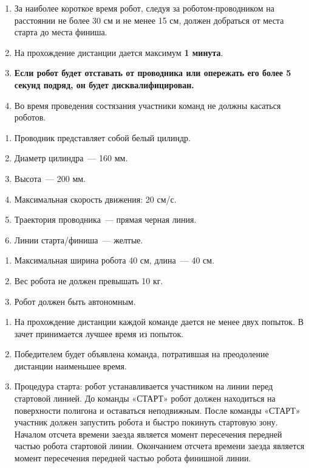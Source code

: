 \noindent{}
\begin{enumerate}
	\item За наиболее короткое время робот, следуя за роботом-проводником на расстоянии не более 30 см и не менее 15 см, должен добраться от места старта до места финиша.
	\item На прохождение дистанции дается максимум {\bfseries 1 минута}.
	\item {\bfseries Если робот будет отставать от проводника или опережать его более 5 секунд подряд, он будет дисквалифицирован.}	
	\item Во время проведения состязания участники команд не должны касаться роботов.
\end{enumerate}

\noindent{}
\begin{enumerate}
	\item Проводник представляет собой белый цилиндр.
	\item Диаметр цилиндра~--- 160 мм.
	\item Высота~--- 200 мм.
	\item Максимальная скорость движения: 20 см/с.
	\item Траектория проводника~--- прямая черная линия.
	\item Линии старта/финиша~--- желтые.
\end{enumerate}

\noindent{}
\begin{enumerate}
	\item Максимальная ширина робота 40 см, длина~--- 40 см.
	\item Вес робота не должен превышать 10 кг.
	\item Робот должен быть автономным.
\end{enumerate}	

\noindent{}
\begin{enumerate}
	\item На прохождение дистанции каждой команде дается не менее двух попыток. В зачет принимается лучшее время из попыток.
	\item Победителем будет объявлена команда, потратившая на преодоление дистанции наименьшее время.
	\item Процедура старта: робот устанавливается участником на линии перед стартовой линией. До команды «СТАРТ» робот должен находиться на поверхности полигона и оставаться неподвижным. После команды «СТАРТ» участник должен запустить робота и быстро покинуть стартовую зону. Началом отсчета времени заезда является момент пересечения передней частью робота стартовой линии. Окончанием отсчета времени заезда является момент пересечения передней частью робота финишной линии.\\\\
\end{enumerate}		


